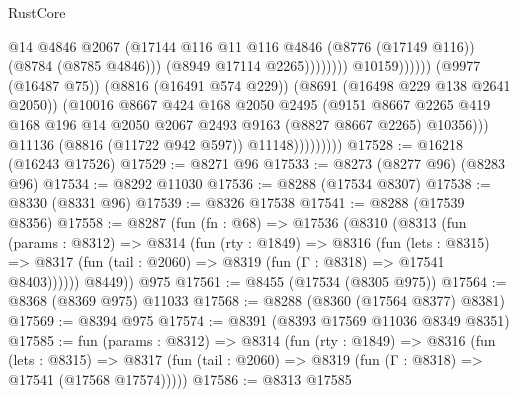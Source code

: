 \begin{lexlean}{RustCore}
\begin{coremodule}
                                                  @14
                                                  @4846
                                                  @2067
                                                  (@17144
                                                    @116
                                                    @11
                                                    @116
                                                    @4846
                                                    (@8776 (@17149 @116))
                                                    (@8784 (@8785 @4846)))
                                                  (@8949 @17114 @2265))))))))
                                    @10159))))))
                        (@9977 (@16487 @75))
                        (@8816 (@16491 @574 @229))
                        (@8691 (@16498 @229 @138 @2641 @2050))
                        (@10016
                          @8667
                          @424
                          @168
                          @2050
                          @2495
                          (@9151
                            @8667
                            @2265
                            @419
                            @168
                            @196
                            @14
                            @2050
                            @2067
                            @2493
                            @9163
                            (@8827 @8667 @2265)
                            @10356)))
                      @11136
                      (@8816 (@11722 @942 @597))
                      @11148)))))))))
@17528 := @16218 (@16243 @17526)
@17529 := @8271 @96
@17533 := @8273 (@8277 @96) (@8283 @96)
@17534 := @8292 @11030
@17536 := @8288 (@17534 @8307)
@17538 := @8330 (@8331 @96)
@17539 := @8326 @17538
@17541 := @8288 (@17539 @8356)
@17558 := @8287
    (fun (fn : @68) =>
    @17536
      (@8310
        (@8313
          (fun (params : @8312) =>
          @8314
            (fun (rty : @1849) =>
            @8316
              (fun (lets : @8315) =>
              @8317 (fun (tail : @2060) => @8319 (fun (Γ : @8318) => @17541 @8403))))))
        @8449))
    @975
@17561 := @8455 (@17534 (@8305 @975))
@17564 := @8368 (@8369 @975) @11033
@17568 := @8288 (@8360 (@17564 @8377) @8381)
@17569 := @8394 @975
@17574 := @8391 (@8393 @17569 @11036 @8349 @8351)
@17585 := fun (params : @8312) =>
  @8314
    (fun (rty : @1849) =>
    @8316
      (fun (lets : @8315) =>
      @8317 (fun (tail : @2060) => @8319 (fun (Γ : @8318) => @17541 (@17568 @17574)))))
@17586 := @8313 @17585

\end{coremodule}
\end{lexlean}
